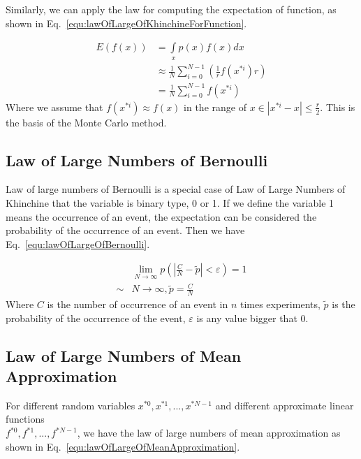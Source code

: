 \documentclass[runningheads,openany]{xhlPaper}
\begin{document}
Similarly, we can apply the law for computing the expectation of function, as shown in Eq.~\ref{equ:lawOfLargeOfKhinchineForFunction}.

\begin{equation}
\label{equ:lawOfLargeOfKhinchineForFunction}
\begin{aligned}
E\left( {f\left( x \right)} \right) &= \int\limits_x {p\left( x \right)f\left( x \right)dx} \\
 &\approx \frac{1}{N}\sum\limits_{i = 0}^{N - 1} {\left( {\frac{1}{r}f\left( {{x^{*i}}} \right)r} \right)} \\
 &= \frac{1}{N}\sum\limits_{i = 0}^{N - 1} {f\left( {{x^{*i}}} \right)} 
\end{aligned}
\end{equation}
Where we assume that $f\left(x^{*i}\right) \approx f\left(x\right)$ in the range of $x \in {|{x^{*i}} - x| \le \frac{r}{2}}$. This is the basis of the Monte Carlo method.

\subsection{Law of Large Numbers of Bernoulli}
Law of large numbers of Bernoulli is a special case of Law of Large Numbers of Khinchine that the variable is binary type, 0 or 1. If we define the variable 1 means the occurrence of an event, the expectation can be considered the probability of the occurrence of an event. Then we have Eq.~\ref{equ:lawOfLargeOfBernoulli}.

\begin{equation}
\label{equ:lawOfLargeOfBernoulli}
\begin{aligned}
&\mathop {\lim }\limits_{N \to \infty } p\left( {|\frac{C}{N} - \tilde p| < \varepsilon } \right) = 1\\
 \sim &N \to \infty ,\tilde p = \frac{C}{N}
\end{aligned}
\end{equation}
Where $C$ is the number of occurrence of an event in $n$ times experiments, $\tilde{p}$ is the probability of the occurrence of the event, $\varepsilon$ is any value bigger that 0.

\subsection{Law of Large Numbers of Mean Approximation}
For different random variables $x^{*0}, x^{*1}, ..., x^{*N-1}$ and different approximate linear functions \\
$f^{*0}, f^{*1}, ..., f^{*N-1}$, we have the law of large numbers of mean approximation as shown in Eq.~\ref{equ:lawOfLargeOfMeanApproximation}.
\end{document}
